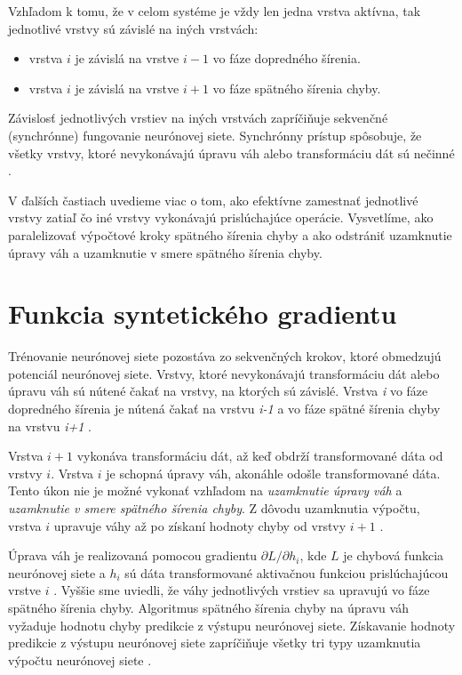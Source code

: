 Vzhľadom k tomu, že v celom systéme je vždy len jedna vrstva aktívna, tak jednotlivé vrstvy sú závislé na iných vrstvách:
\begin{itemize}
    \item vrstva $i$ je závislá na vrstve $i-1$ vo fáze dopredného šírenia.
    \item vrstva $i$ je závislá na vrstve $i+1$ vo fáze spätného šírenia chyby.
\end{itemize}
Závislosť jednotlivých vrstiev na iných vrstvách zapríčiňuje sekvenčné (synchrónne) fungovanie neurónovej siete. Synchrónny prístup spôsobuje, že všetky vrstvy, ktoré nevykonávajú úpravu váh alebo transformáciu dát sú nečinné \cite{Jaderberg2016}.

V ďalších častiach uvedieme viac o tom, ako efektívne zamestnať jednotlivé vrstvy zatiaľ čo iné vrstvy vykonávajú prislúchajúce operácie. Vysvetlíme, ako paralelizovať výpočtové kroky spätného šírenia chyby a ako odstrániť uzamknutie úpravy váh a uzamknutie v smere spätného šírenia chyby.

\section{Funkcia syntetického gradientu}
\label{understanding_SG} %
Trénovanie neurónovej siete pozostáva zo sekvenčných krokov, ktoré obmedzujú potenciál neurónovej siete. Vrstvy, ktoré nevykonávajú transformáciu dát alebo úpravu váh sú nútené čakať na vrstvy, na ktorých sú závislé. Vrstva \textit{i} vo fáze dopredného šírenia je nútená čakať na vrstvu \textit{i-1} a vo fáze spätné šírenia chyby na vrstvu \textit{i+1} \cite{Jaderberg2016}. 

Vrstva $i+1$ vykonáva transformáciu dát, až keď obdrží transformované dáta od vrstvy $i$. Vrstva $i$ je schopná úpravy váh, akonáhle odošle transformované dáta. Tento úkon nie je možné vykonať vzhľadom na \textit{uzamknutie úpravy váh} a \textit{uzamknutie v smere spätného šírenia chyby}. Z dôvodu uzamknutia výpočtu, vrstva $i$ upravuje váhy až po získaní hodnoty chyby od vrstvy $i+1$ \cite{Jaderberg2016}.


Úprava váh je realizovaná pomocou gradientu $\partial L/\partial h_i$, kde $L$ je chybová funkcia neurónovej siete a $h_i$ sú dáta transformované aktivačnou funkciou prislúchajúcou vrstve $i$ \cite{Goh1995}. Vyššie sme uviedli, že váhy jednotlivých vrstiev sa upravujú vo fáze spätného šírenia chyby. Algoritmus spätného šírenia chyby na úpravu váh vyžaduje hodnotu chyby predikcie z výstupu neurónovej siete. Získavanie hodnoty predikcie z výstupu neurónovej siete zapríčiňuje všetky tri typy uzamknutia výpočtu neurónovej siete \cite{Goh1995, Czarnecki2017, Jaderberg2016}.

